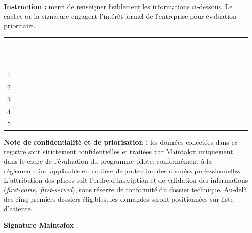 \documentclass[11pt,a4paper]{article}
\begin{document}
\vspace{1mm}
{\normalsize\textcolor{MFXMuted}{\textbf{Instruction :} merci de renseigner lisiblement les informations ci-dessous. Le cachet ou la signature engagent l'intérêt formel de l'entreprise pour évaluation prioritaire.}}

\vspace{1mm}
\setlength{\tabcolsep}{5pt}
\begin{tabularx}{\textwidth}{|
  >{\centering\arraybackslash}p{0.35cm}|
  >{\RaggedRight\arraybackslash}p{3.2cm}|
  >{\RaggedRight\arraybackslash}p{4.4cm}|
  >{\RaggedRight\arraybackslash}p{3.5cm}|
  >{\RaggedRight\arraybackslash}X|}
\hline
\rowcolor{MFXPrimary}
\textcolor{white}{\textbf{\#}} &
\textcolor{white}{\textbf{Entreprise}} &
\textcolor{white}{\textbf{Nom du Responsable \& Fonction}} &
\textcolor{white}{\textbf{Cachet et Signature}} &
\textcolor{white}{\textbf{Contact Direct (Email/Tél)}} \\
\hline
\rule{0pt}{1.18cm}1 & & & & \\
\hline
\rule{0pt}{1.18cm}2 & & & & \\
\hline
\rule{0pt}{1.18cm}3 & & & & \\
\hline
\rule{0pt}{1.18cm}4 & & & & \\
\hline
\rule{0pt}{1.18cm}5 & & & & \\
\hline
\end{tabularx}

\vspace{1mm}
\begin{tcolorbox}[
  colback=white,
  colframe=MFXAccent,
  boxrule=0.8pt,
  sharp corners,
  left=6pt,right=6pt,top=4pt,bottom=4pt
]
\small
\textbf{Note de confidentialité et de priorisation :}
les données collectées dans ce registre sont strictement confidentielles et traitées par Maintafox uniquement dans le cadre de l'évaluation du programme pilote, conformément à la réglementation applicable en matière de protection des données professionnelles.
L'attribution des places suit l'ordre d'inscription et de validation des informations (\textit{first-come, first-served}), sous réserve de conformité du dossier technique.
Au-delà des cinq premiers dossiers éligibles, les demandes seront positionnées sur liste d'attente.
\end{tcolorbox}

\vspace{1mm}
{\normalsize
\textbf{Signature Maintafox} : \underline{\hspace{6.5cm}}
}
\end{document}

